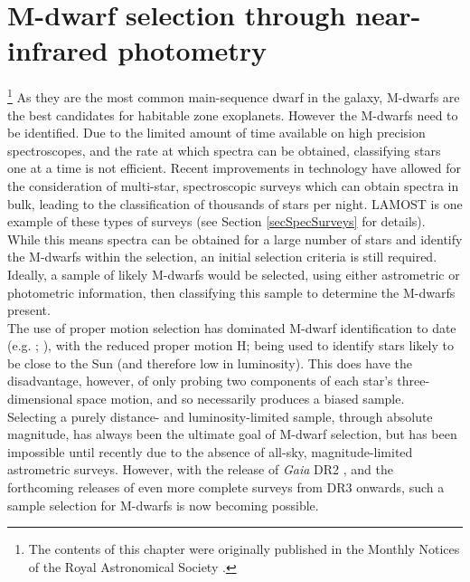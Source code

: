 \chapter{M-dwarf selection through near-infrared photometry}
\label{ChapPhot}
\footnote{The contents of this chapter were originally published in the Monthly Notices of the Royal Astronomical Society \citep{2019Bentley}.}
As they are the most common main-sequence dwarf in the galaxy, M-dwarfs are the best candidates for habitable zone exoplanets. However the M-dwarfs need to be identified. Due to the limited amount of time available on high precision spectroscopes, and the rate at which spectra can be obtained, classifying stars one at a time is not efficient. Recent improvements in technology have allowed for the consideration of multi-star, spectroscopic surveys which can obtain spectra in bulk, leading to the classification of thousands of stars per night. LAMOST is one example of these types of surveys (see Section \ref{secSpecSurveys} for details).\\

While this means spectra can be obtained for a large number of stars and identify the M-dwarfs within the selection, an initial selection criteria is still required. Ideally, a sample of likely M-dwarfs would be selected, using either astrometric or photometric information, then classifying this sample to determine the M-dwarfs present.\\

The use of proper motion selection has dominated M-dwarf identification to date (e.g. \citealt{1979Luyten}; \citealt{2000Zacharias}), with the reduced proper motion H; \citep{1922Luyten} being used to identify stars likely to be close to the Sun (and therefore low in luminosity). This does have the disadvantage, however, of only probing two components of each star's three-dimensional space motion, and so necessarily produces a biased sample.\\

Selecting a purely distance- and luminosity-limited sample, through absolute magnitude, has always been the ultimate goal of M-dwarf selection, but has been impossible until recently due to the absence of all-sky, magnitude-limited astrometric surveys. However, with the release of {\em Gaia} DR2 \citep{2016Gaia}, and the forthcoming releases of even more complete surveys from DR3 onwards, such a sample selection for M-dwarfs is now becoming possible.\\


